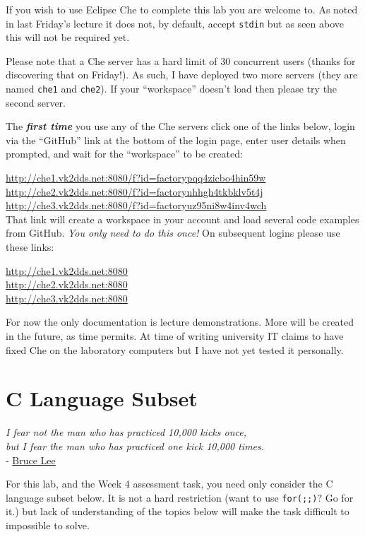 \documentclass{lab}
\begin{document}
If you wish to use Eclipse Che to complete this lab you are welcome to. As noted in last Friday's lecture it does not, by default, accept \texttt{stdin} but as seen above this will not be required yet.

Please note that a Che server has a hard limit of 30 concurrent users (thanks for discovering that on Friday!). As such, I have deployed two more servers (they are named \texttt{che1} and \texttt{che2}). If your ``workspace'' doesn't load then please try the second server.

The \textit{\textbf{first time}} you use any of the Che servers click one of the links below, login via the ``GitHub'' link at the bottom of the login page, enter user details when prompted, and wait for the ``workspace'' to be created:

\url{http://che1.vk2dds.net:8080/f?id=factorypqq4zicbo4hin59w} \\
\url{http://che2.vk2dds.net:8080/f?id=factorynhhgh4tkbklv5t4j} \\
\url{http://che3.vk2dds.net:8080/f?id=factoryuz95ni8w4inv4wch}\\

That link will create a workspace in your account and load several code examples from GitHub. \textit{You only need to do this once!} On subsequent logins please use these links:

\url{http://che1.vk2dds.net:8080} \\
\url{http://che2.vk2dds.net:8080} \\
\url{http://che3.vk2dds.net:8080}

For now the only documentation is lecture demonstrations. More will be created in the future, as time permits. At time of writing university IT claims to have fixed Che on the laboratory computers but I have not yet tested it personally.

\pagebreak
\section{C Language Subset}

\begin{center}
\textit{I fear not the man who has practiced 10,000 kicks once,\\but I fear the man who has practiced one kick 10,000 times.}\\- \href{https://www.youtube.com/watch?v=bmfudW7rbG0}{Bruce Lee}
\end{center}

For this lab, and the Week 4 assessment task, you need only consider the C language subset below. It is not a hard restriction (want to use \texttt{for(;;)}? Go for it.) but lack of understanding of the topics below will make the task difficult to impossible to solve.
\end{document}
